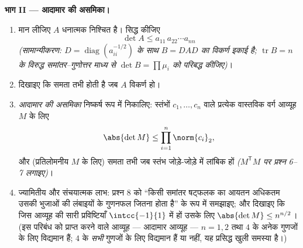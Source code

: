 \begin{problem}
\medskip
\noindent\textbf{भाग II --- आदामार की असमिका।}
\begin{enumerate}[resume]
  \item मान लीजिए $A$ धनात्मक निश्चित है। सिद्ध कीजिए
        \[
        \det A \leq a_{11}\,a_{22}\cdots a_{nn}
        \]
        \emph{(सामान्यीकरण: $D =
        \operatorname{diag}(a_{ii}^{-1/2})$ के साथ $B = DAD$ का विकर्ण इकाई है; $\operatorname{tr} B = n$ के
        विरुद्ध समांतर--गुणोत्तर माध्य से $\det B = \prod \mu_i$ को परिबद्ध कीजिए)}।
  \item दिखाइए कि समता तभी होती है जब $A$ विकर्ण हो।
  \item \emph{आदामार की असमिका} निष्कर्ष रूप में निकालिए: स्तंभों $c_1, \dots, c_n$
        वाले प्रत्येक वास्तविक वर्ग आव्यूह $M$ के लिए
        \[
        \abs{\det M} \leq \prod_{i=1}^{n}\norm{c_i}_2 ,
        \]
        और (प्रतिलोमनीय $M$ के लिए) समता तभी जब स्तंभ जोड़े-जोड़े में
        लांबिक हों \emph{($M^{\mathsf T}M$ पर प्रश्न 6--7 लगाइए)}।
  \item ज्यामितीय और संचयात्मक लाभ: प्रश्न 8 को ``किसी समांतर षट्फलक का
        आयतन अधिकतम उसकी भुजाओं की लंबाइयों के गुणनफल जितना होता है'' के
        रूप में समझाइए; और दिखाइए कि जिस आव्यूह की सारी प्रविष्टियाँ $\intcc{-1}{1}$
        में हों उसके लिए $\abs{\det M} \leq n^{n/2}$। (इस परिबंध को प्राप्त करने वाले आव्यूह ---
        आदामार आव्यूह --- $n = 1, 2$ तथा $4$ के अनेक गुणजों के लिए विद्यमान
        हैं; $4$ के \emph{सभी} गुणजों के लिए विद्यमान हैं या नहीं, यह
        प्रसिद्ध खुली समस्या है।)
\end{enumerate}


\end{problem}
